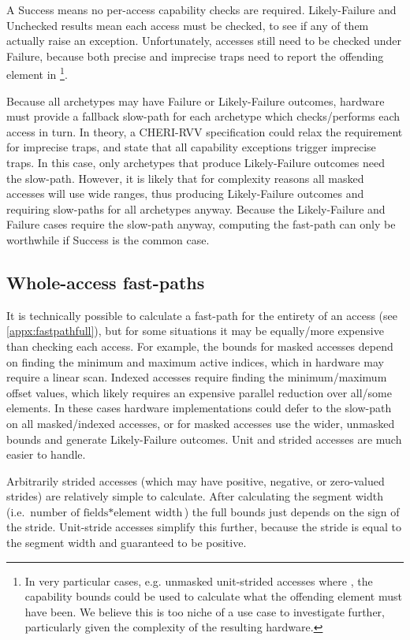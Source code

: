 A Success means no per-access capability checks are required.
Likely-Failure and Unchecked results mean each access must be checked, to see if any of them actually raise an exception.
Unfortunately, accesses still need to be checked under Failure, because both precise and imprecise traps need to report the offending element in \footnote{In very particular cases, e.g. unmasked unit-strided accesses where , the capability bounds could be used to calculate what the offending element must have been. We believe this is too niche of a use case to investigate further, particularly given the complexity of the resulting hardware.}.

Because all archetypes may have Failure or Likely-Failure outcomes, hardware must provide a fallback slow-path for each archetype which checks/performs each access in turn.
In theory, a CHERI-RVV specification could relax the  requirement for imprecise traps, and state that all capability exceptions trigger imprecise traps.
In this case, only archetypes that produce Likely-Failure outcomes need the slow-path.
However, it is likely that for complexity reasons all masked accesses will use wide ranges, thus producing Likely-Failure outcomes and requiring slow-paths for all archetypes anyway.
Because the Likely-Failure and Failure cases require the slow-path anyway, computing the fast-path can only be worthwhile if Success is the common case.

\subsection{Whole-access fast-paths}\label{chap:hardware:subsec:wholeaccessfastpath}
It is technically possible to calculate a fast-path for the entirety of an access (see \cref{appx:fastpathfull}), but for some situations it may be equally/more expensive than checking each access.
For example, the bounds for masked accesses depend on finding the minimum and maximum active indices, which in hardware may require a linear scan.
Indexed accesses require finding the minimum/maximum offset values, which likely requires an expensive parallel reduction over all/some elements.
In these cases hardware implementations could defer to the slow-path on all masked/indexed accesses, or for masked accesses use the wider, unmasked bounds and generate Likely-Failure outcomes.
Unit and strided accesses are much easier to handle.

Arbitrarily strided accesses (which may have positive, negative, or zero-valued strides) are relatively simple to calculate.
After calculating the segment width (i.e. $\text{number of fields} * \text{element width}$) the full bounds just depends on the sign of the stride.
Unit-stride accesses simplify this further, because the stride is equal to the segment width and guaranteed to be positive.

